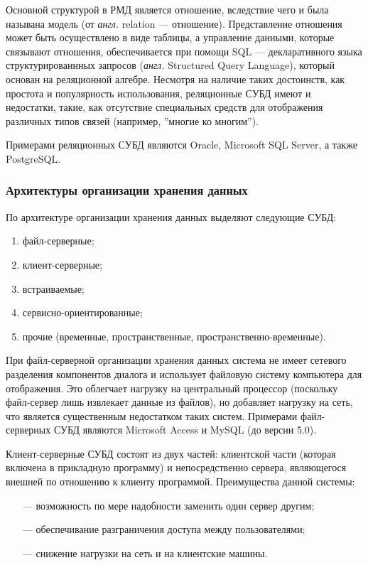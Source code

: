 Основной структурой в РМД является отношение, вследствие чего и была называна модель (от \textit{англ.} relation --- отношение). 
Представление отношения может быть осуществлено в виде таблицы, а управление данными, которые связывают отношения, обеспечивается при помощи SQL --- декларативного языка структурированнных запросов (\textit{англ.} Structured Query Language), который основан на реляционной алгебре. 
Несмотря на наличие таких достоинств, как простота и популярность использования, реляционные СУБД имеют и недостатки, такие, как отсутствие специальных средств для отображения различных типов связей (например, ''многие ко многим'').

Примерами реляционных СУБД являются Oracle, Microsoft SQL Server, а также PostgreSQL.

\subsubsection{Архитектуры организации хранения данных}

По архитектуре организации хранения данных выделяют следующие \linebreak СУБД:

\begin{enumerate}[label=\arabic*)]
	\item файл-серверные;
	\item клиент-серверные;
	\item встраиваемые;
	\item сервисно-ориентированные;
	\item прочие (временные, пространственные, пространственно-временные).
\end{enumerate}

При файл-серверной организации хранения данных система не имеет сетевого разделения компонентов диалога и использует файловую систему компьютера для отображения. 
Это облегчает нагрузку на центральный процессор (поскольку файл-сервер лишь извлекает данные из файлов), но добавляет нагрузку на сеть, что является существенным недостатком таких систем.
Примерами  файл-серверных СУБД являются  Microsoft Access и MySQL (до версии 5.0).

Клиент-серверные СУБД состоят из двух частей: клиентской части (которая включена в прикладную программу) и непосредственно сервера, являющегося внешней по отношению к клиенту программой. Преимущества данной системы:
\begin{itemize}[leftmargin=1.6\parindent]
	\item[---] возможность по мере надобности заменить один сервер другим;
	\item[---] обеспечивание разграничения доступа между пользователями;
	\item[---] снижение нагрузки на сеть и на клиентские машины.
\end{itemize}

